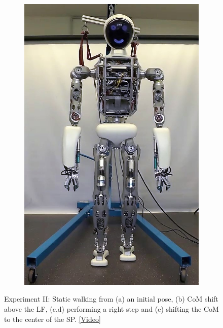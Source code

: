 \begin{figure}
\begin{subfigure}{.2\textwidth}
	\includegraphics[width=.95\linewidth]{experiments/walkStatic/snaps/5}
	\caption{}
	\end{subfigure}%
\caption[Experiment II: Static walking]{Experiment II: Static walking from (a) an initial pose, (b) \gls{CoM} shift above the \gls{LF}, (c,d) performing a right step and (e) shifting the \gls{CoM} to the center of the \gls{SP}. \href{https://github.com/julesser/ma-thesis-experimental-results/tree/master/walkStatic}{[Video]}}
\label{exp:staticWalkingSnaps}
\end{figure} 


